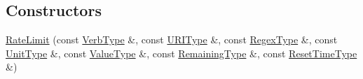 \subsection*{Constructors}
\begin{DoxyCompactItemize}
\item 
\hypertarget{classopenstack_1_1xml_1_1RateLimit_a5bdc0d5af473087d54380c2f9b0886e4}{
\hyperlink{classopenstack_1_1xml_1_1RateLimit_a5bdc0d5af473087d54380c2f9b0886e4}{RateLimit} (const \hyperlink{classopenstack_1_1xml_1_1HTTPVerb}{VerbType} \&, const \hyperlink{classopenstack_1_1xml_1_1RateLimit_af7901803e96cb338e2560358c8ce931b}{URIType} \&, const \hyperlink{classopenstack_1_1xml_1_1RateLimit_a548c5e538a1408da78611116ac40aab2}{RegexType} \&, const \hyperlink{classopenstack_1_1xml_1_1RateLimitUnit}{UnitType} \&, const \hyperlink{classopenstack_1_1xml_1_1RateLimit_acafa69c685469c50108cb0f4c54a5ce2}{ValueType} \&, const \hyperlink{classopenstack_1_1xml_1_1RateLimit_a13144403e8af4dadd7e149adc68ff5d1}{RemainingType} \&, const \hyperlink{classopenstack_1_1xml_1_1RateLimit_a040904fe6210dfa7070906275285989b}{ResetTimeType} \&)}
\label{classopenstack_1_1xml_1_1RateLimit_a5bdc0d5af473087d54380c2f9b0886e4}


\end{DoxyCompactItemize}
